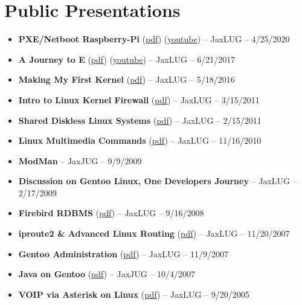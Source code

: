 \documentclass[10pt]{report}
\begin{document}
\section*{Public Presentations}
\begin{itemize}
  \item \textbf{PXE/Netboot Raspberry-Pi} (\href{https://obsidian-studios.com/~wlt/presentations/2020-04-15_jaxlug_pxe_network_booting_raspberry_pis.pdf}{pdf}) (\href{https://www.youtube.com/watch?v=kT5jlbRNgcE}{youtube}) – JaxLUG – 4/25/2020
  \item \textbf{A Journey to E} (\href{https://obsidian-studios.com/~wlt/presentations/2017-06-21_jaxlug_a_journey_to_e.pdf}{pdf}) (\href{https://www.youtube.com/watch?v=jbDpKjznI3M}{youtube}) – JaxLUG – 6/21/2017
  \item \textbf{Making My First Kernel} (\href{https://obsidian-studios.com/~wlt/presentations/2016-05-18_jaxlug_making_my_first_kernel.pdf}{pdf}) – JaxLUG – 5/18/2016
  \item \textbf{Intro to Linux Kernel Firewall} (\href{http://www.obsidian-studios.com/~wlt/presentations/2011-03-15_jaxlug_intro_to_linux_kernel_firewall.pdf}{pdf}) – JaxLUG – 3/15/2011
  \item \textbf{Shared Diskless Linux Systems} (\href{http://www.obsidian-studios.com/~wlt/presentations/2011-02-15_jaxlug_shared_diskless_linux_systems.pdf}{pdf}) – JaxLUG – 2/15/2011
  \item \textbf{Linux Multimedia Commands} (\href{http://www.obsidian-studios.com/~wlt/presentations/2010_11_16_jaxlug_linux_multimedia_commands.pdf}{pdf}) – JaxLUG – 11/16/2010
  \item \textbf{ModMan} – JaxJUG – 9/9/2009
  \item \textbf{Discussion on Gentoo Linux, One Developers Journey} – JaxLUG – 2/17/2009
  \item \textbf{Firebird RDBMS} (\href{http://www.obsidian-studios.com/~wlt/presentations/2008_09_16_jaxlug_firebird_rdbms.pdf}{pdf}) – JaxLUG – 9/16/2008
  \item \textbf{iproute2 \& Advanced Linux Routing} (\href{http://www.obsidian-studios.com/~wlt/presentations/2007_11_20_jaxlug_iproute2_\&_advanced_linux_routing.pdf}{pdf}) – JaxLUG – 11/20/2007
  \item \textbf{Gentoo Administration} (\href{http://www.obsidian-studios.com/~wlt/presentations/2007_09_11_jaxlug_gentoo_administration.pdf}{pdf}) – JaxLUG – 11/9/2007
  \item \textbf{Java on Gentoo} (\href{http://www.obsidian-studios.com/~wlt/presentations/2007_04_10_jaxjug_java_on_gentoo.pdf}{pdf}) – JaxJUG – 10/4/2007
  \item \textbf{VOIP via Asterisk on Linux} (\href{http://www.obsidian-studios.com/~wlt/presentations/2005_09_20_jaxlug_voip_via_asterisk_on_linux.pdf}{pdf}) – JaxLUG – 9/20/2005
\end{itemize}
\end{document}
